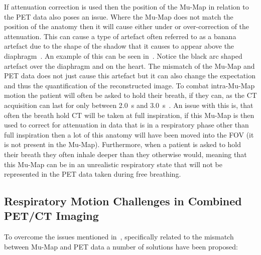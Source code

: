             If attenuation correction is used then the position of the \gls{Mu-Map} in relation to the \gls{PET} data also poses an issue. Where the \gls{Mu-Map} does not match the position of the anatomy then it will cause either under or over-correction of the attenuation. This can cause a type of artefact often referred to as a banana artefact due to the shape of the shadow that it causes to appear above the diaphragm~\parencite{LungMotionDiaphragmBaiBib}. An example of this can be seen in~. Notice the black arc shaped artefact over the diaphragm and on the heart. The mismatch of the \gls{Mu-Map} and \gls{PET} data does not just cause this artefact but it can also change the expectation and thus the quantification of the reconstructed image. To combat intra-\gls{Mu-Map} motion the patient will often be asked to hold their breath, if they can, as the \gls{CT} acquisition can last for only between \SI{2.0}{\second} and \SI{3.0}{\second}~\parencite{Nyflot2015}. An issue with this is, that often the breath hold \gls{CT} will be taken at full inspiration, if this \gls{Mu-Map} is then used to correct for attenuation in data that is in a respiratory phase other than full inspiration then a lot of this anatomy will have been moved into the \gls{FOV} (it is not present in the \gls{Mu-Map}). Furthermore, when a patient is asked to hold their breath they often inhale deeper than they otherwise would, meaning that this \gls{Mu-Map} can be in an unrealistic respiratory state that will not be represented in the \gls{PET} data taken during free breathing. %
            
        \subsection{Respiratory Motion Challenges in Combined PET/CT Imaging} \label{sec:respiratory_motion_challenges_in_combined_pet_ct_imaging}
            To overcome the issues mentioned in~, specifically related to the mismatch between \gls{Mu-Map} and \gls{PET} data a number of solutions have been proposed:
            

